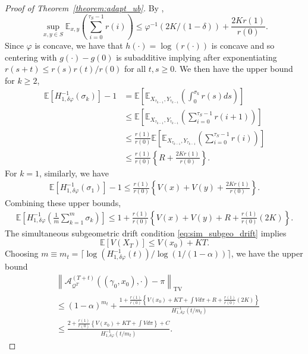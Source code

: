 \documentclass[12pt]{article}
\theoremstyle{plain}
\theoremstyle{remark}
\newtheorem{remark}[theorem]{Remark}
\newcommand{\norm}[1]{\left\lVert#1\right\rVert}
\newcommand{\Z}{\mathbb{Z}}
\newcommand{\Q}{\mathcal{Q}}
\newcommand{\E}{\mathbb{E}}
\renewcommand{\P}{\mathcal{P}}
\newcommand{\A}{\mathcal{A}}
\newcommand{\X}{\mathcal{X}}
\let\temp\phi
\let\phi\varphi
\let\varphi\temp
\newcommand{\eq}[1]{\begin{align*}#1\end{align*}}
\begin{document}
\begin{proof}[Proof of Theorem~\ref{theorem:adapt_ub}]
By \citep[Proposition 2.2]{douc:etal:2004},
\[
\sup_{x, y \in S} \E_{x, y} \left( \sum_{i = 0}^{\tau_S - 1} r(i) \right)
\le \phi^{-1}( 2 K/(1 - \delta) ) + \frac{2 K r(1)}{r(0)}.
\]
Since $\phi$ is concave, we have that $h(\cdot) = \log( r(\cdot) )$ is concave and so centering with $g(\cdot) - g(0)$ is subadditive implying after exponentiating $r(s + t) \le r(s)r(t) / r(0)$ for all $t, s \ge 0$.
We then have the upper bound for $k \ge 2$,
\eq{
\E\left[ H_{1, \delta \phi}^{-1}( \sigma_k ) \right] - 1
&= \E\left[ \E_{X_{\tau_{k-1}}, Y_{\tau_{k-1}}} \left( \int^{\sigma_k}_0 r(s) ds \right) \right]
\\
&\le \E\left[ \E_{X_{\tau_{k-1}}, Y_{\tau_{k-1}}} \left( \sum_{i = 0}^{\tau_S - 1} r(i + 1) \right) \right]
\\
&\le \frac{r(1)}{r(0)} \E\left[ \E_{X_{\tau_{k-1}}, Y_{\tau_{k-1}}} \left( \sum_{i = 0}^{\tau_S - 1} r(i) \right) \right]
\\
&\le \frac{r(1)}{r(0)} \left\{ R + \frac{2 K r(1)}{r(0)} \right \}.
}
For $k = 1$, similarly, we have
\eq{
\E\left[ H_{1, \delta \phi}^{-1}( \sigma_1 ) \right] - 1
\le \frac{r(1)}{r(0)} \left\{ V(x) + V(y) + \frac{2 K r(1)}{r(0)} \right \}.
}
Combining these upper bounds,
\eq{
\E\left[ H_{1, \delta \phi}^{-1}\left( \frac{1}{m} \sum_{k = 1}^m \sigma_k \right) \right]
\le 1 + \frac{r(1)}{r(0)} \left\{  V(x) + V(y) + R + \frac{r(1)}{r(0)} ( 2 K ) \right\}.
}
The simultaneous subgeometric drift condition \eqref{eq:sim_subgeo_drift} implies
\[
\E\left[ V( X_{T} ) \right]
\le V(x_0) + K T.
\]
Choosing $m \equiv m_t = \lceil \log( H_{1, \delta \phi}^{-1}(t) ) / \log(1/(1-\alpha)) \rceil$, we have the upper bound
\eq{
&\norm{ \A_{\Q^{T}}^{(T + t)}((\gamma_0, x_0), \cdot) - \pi }_{\text{TV}}
\\
&\le (1 - \alpha)^{m_t} 
+ \frac{ 1 + \frac{r(1)}{r(0)} \left\{  V(x_0) + K T + \int V d\pi + R + \frac{r(1)}{r(0)} ( 2 K ) \right\} }{ H_{1, \delta \phi}^{-1}(t/m_t) }
\\
&\le \frac{ 2 + \frac{r(1)}{r(0)} \left\{  V(x_0) + K T + \int V d\pi \right\} + C  }{ H_{1, \delta \phi}^{-1}(t/m_t) }.
}
\end{proof}

\end{document}
